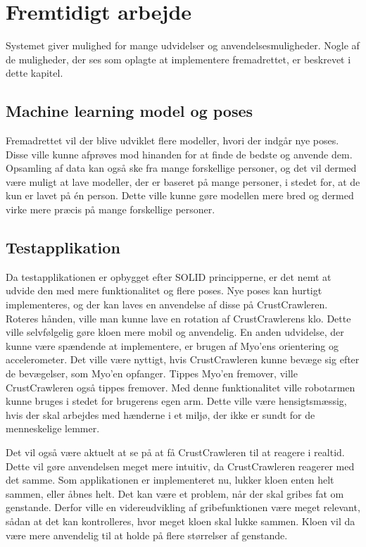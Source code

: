\thispagestyle{fancy}
\chapter{Fremtidigt arbejde}
\label{chp:fremtidigtarbejde}
Systemet giver mulighed for mange udvidelser og anvendelsesmuligheder. Nogle af de muligheder, der ses som oplagte at implementere fremadrettet, er beskrevet i dette kapitel.

\section{Machine learning model og poses}
Fremadrettet vil der blive udviklet flere modeller, hvori der indgår nye poses. Disse ville kunne afprøves mod hinanden for at finde de bedste og anvende dem. Opsamling af data kan også ske fra mange forskellige personer, og det vil dermed være muligt at lave modeller, der er baseret på mange personer, i stedet for, at de kun er lavet på én person. Dette ville kunne gøre modellen mere bred og dermed virke mere præcis på mange forskellige personer.

\section{Testapplikation}
Da testapplikationen er opbygget efter SOLID principperne\citep{RefWorks:10}, er det nemt at udvide den med mere funktionalitet og flere poses. Nye poses kan hurtigt implementeres, og der kan laves en anvendelse af disse på CrustCrawleren. Roteres hånden, ville man kunne lave en rotation af CrustCrawlerens klo. Dette ville selvfølgelig gøre kloen mere mobil og anvendelig. En anden udvidelse, der kunne være spændende at implementere, er brugen af Myo'ens orientering og accelerometer. Det ville være nyttigt, hvis CrustCrawleren kunne bevæge sig efter de bevægelser, som Myo'en opfanger. Tippes Myo'en fremover, ville CrustCrawleren også tippes fremover. Med denne funktionalitet ville robotarmen kunne bruges i stedet for brugerens egen arm. Dette ville være hensigtsmæssig, hvis der skal arbejdes med hænderne i et miljø, der ikke er sundt for de menneskelige lemmer.

Det vil også være aktuelt at se på at få CrustCrawleren til at reagere i realtid. Dette vil gøre anvendelsen meget mere intuitiv, da CrustCrawleren reagerer med det samme. Som applikationen er implementeret nu, lukker kloen enten helt sammen, eller åbnes helt. Det kan være et problem, når der skal gribes fat om genstande. Derfor ville en videreudvikling af gribefunktionen være meget relevant, sådan at det kan kontrolleres, hvor meget kloen skal lukke sammen. Kloen vil da være mere anvendelig til at holde på flere størrelser af genstande.

